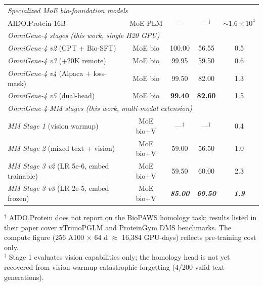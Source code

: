\begin{table}[t]
\begin{tabular}{l c c c c}
\midrule
\multicolumn{5}{l}{\textit{Specialized MoE bio-foundation models}} \\
\quad AIDO.Protein-16B \citep{sun2024aido}                  & MoE PLM   & ---     & ---$^{\dagger}$ & $\sim 1.6\!\times\!10^{4}$ \\
\midrule
\multicolumn{5}{l}{\textit{OmniGene-4 stages (this work, single H20 GPU)}} \\
\quad \textit{OmniGene-4 v2} (CPT + Bio-SFT)                & MoE bio   & 100.00  & 56.55   & 0.5 \\
\quad \textit{OmniGene-4 v3} (+20K remote)                  & MoE bio   &  99.95  & 59.50   & 0.6 \\
\quad \textit{OmniGene-4 v4} (Alpaca + loss-mask)           & MoE bio   &  99.50  & 82.00   & 1.3 \\
\quad \textit{OmniGene-4 v5} (dual-head)                    & MoE bio   & \textbf{99.40} & \textbf{82.60} & 1.5 \\
\midrule
\multicolumn{5}{l}{\textit{OmniGene-4-MM stages (this work, multi-modal extension)}} \\
\quad \textit{MM Stage 1} (vision warmup)                   & MoE bio+V & ---$^{\ddagger}$ & ---$^{\ddagger}$ & 0.4 \\
\quad \textit{MM Stage 2} (mixed text + vision)             & MoE bio+V & 59.00   & 56.50   & 1.0 \\
\quad \textit{MM Stage 3 v2} (LR 5e-6, embed trainable)     & MoE bio+V & 59.50   & 60.00   & 2.3 \\
\quad \textit{MM Stage 3 v3} (LR 2e-5, embed frozen)        & MoE bio+V & \textit{\textbf{85.00}} & \textit{\textbf{69.50}} & \textit{\textbf{1.9}} \\
\bottomrule
\end{tabular}

\vspace{1ex}
\footnotesize
$^{\dagger}$ AIDO.Protein \citep{sun2024aido} does not report on the BioPAWS
homology task; results listed in their paper cover xTrimoPGLM and ProteinGym
DMS benchmarks. The compute figure (256 A100 $\times$ 64 d $\approx$ 16{,}384
GPU-days) reflects pre-training cost only. \\
$^{\ddagger}$ Stage 1 evaluates vision capabilities only; the homology head is
not yet recovered from vision-warmup catastrophic forgetting (4/200 valid
text generations).
\end{table}


